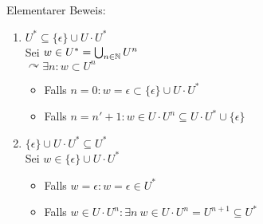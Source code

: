 Elementarer Beweis:
\begin{enumerate}[label={Zeige (\arabic*)},leftmargin=*,itemindent=*]
	\item $U^*\subseteq \{\epsilon\}\cup U\cdot U^*$\\
	Sei $w\in U^*=\bigcup_{n\in\mathbb{N}} U^n$\\
	$\curvearrowright \exists n: w\subset U^n$
	\begin{itemize}
		\item Falls $n=0: w=\epsilon\subset\{\epsilon\}\cup U\cdot U^*$
		\item Falls $n= n'+1: w\in U\cdot U^n\subseteq U\cdot U^*\cup \{\epsilon\}$
	\end{itemize}
	\item $\{\epsilon\}\cup U\cdot U^*\subseteq U^*$\\
	Sei $w\in\{\epsilon\} \cup U\cdot U^*$
	\begin{itemize}
		\item Falls $w=\epsilon: w=\epsilon\in U^*$
		\item Falls $w\in U\cdot U^n: \exists n\ w\in U\cdot U^n = U^{n+1}\subseteq U^*$
	\end{itemize}
\end{enumerate}